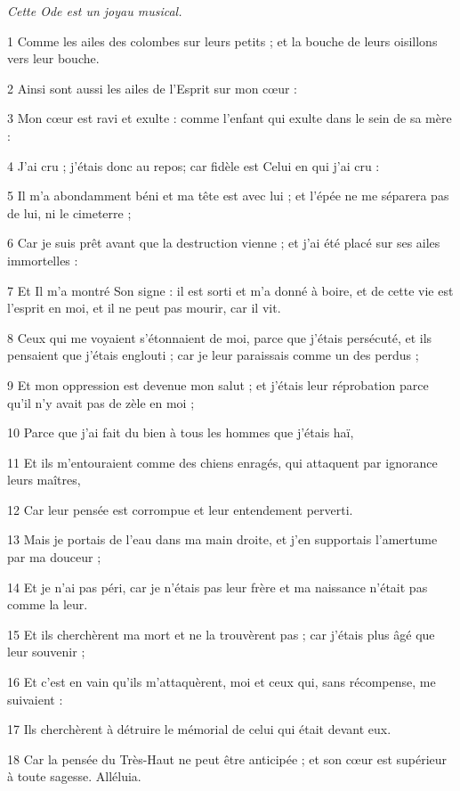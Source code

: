 \par \textit{Cette Ode est un joyau musical.}

\par 1 Comme les ailes des colombes sur leurs petits ; et la bouche de leurs oisillons vers leur bouche.
\par 2 Ainsi sont aussi les ailes de l'Esprit sur mon cœur :
\par 3 Mon cœur est ravi et exulte : comme l'enfant qui exulte dans le sein de sa mère :
\par 4 J'ai cru ; j'étais donc au repos; car fidèle est Celui en qui j'ai cru :
\par 5 Il m'a abondamment béni et ma tête est avec lui ; et l'épée ne me séparera pas de lui, ni le cimeterre ;
\par 6 Car je suis prêt avant que la destruction vienne ; et j'ai été placé sur ses ailes immortelles :
\par 7 Et Il m'a montré Son signe : il est sorti et m'a donné à boire, et de cette vie est l'esprit en moi, et il ne peut pas mourir, car il vit.
\par 8 Ceux qui me voyaient s'étonnaient de moi, parce que j'étais persécuté, et ils pensaient que j'étais englouti ; car je leur paraissais comme un des perdus ;
\par 9 Et mon oppression est devenue mon salut ; et j'étais leur réprobation parce qu'il n'y avait pas de zèle en moi ;
\par 10 Parce que j'ai fait du bien à tous les hommes que j'étais haï,
\par 11 Et ils m'entouraient comme des chiens enragés, qui attaquent par ignorance leurs maîtres,
\par 12 Car leur pensée est corrompue et leur entendement perverti.
\par 13 Mais je portais de l'eau dans ma main droite, et j'en supportais l'amertume par ma douceur ;
\par 14 Et je n'ai pas péri, car je n'étais pas leur frère et ma naissance n'était pas comme la leur.
\par 15 Et ils cherchèrent ma mort et ne la trouvèrent pas ; car j'étais plus âgé que leur souvenir ;
\par 16 Et c'est en vain qu'ils m'attaquèrent, moi et ceux qui, sans récompense, me suivaient :
\par 17 Ils cherchèrent à détruire le mémorial de celui qui était devant eux.
\par 18 Car la pensée du Très-Haut ne peut être anticipée ; et son cœur est supérieur à toute sagesse. Alléluia.

